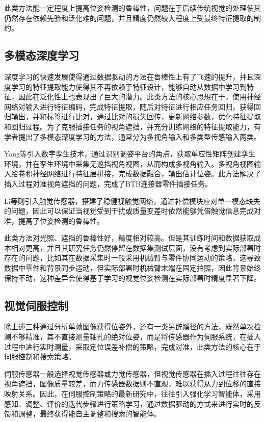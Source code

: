 \documentclass{Diploma}
\begin{document}
此类方法能一定程度上提高位姿检测的鲁棒性，问题在于后续传统视觉的处理使其仍然存在依赖先验和泛化难的问题，并且精度仍然较大程度上受最终特征提取的制约。
\subsection{多模态深度学习}
深度学习的快速发展使得通过数据驱动的方法在鲁棒性上有了飞速的提升，并且深度学习的特征提取能力使得其不再依赖于特征设计，能够自动从数据中学习到特征，因此在泛化性上也表现出了巨大的潜力。此类方法的核心思想在于，使用神经网络对输入进行特征编码，完成特征提取，随后对特征进行相应任务回归，获得回归输出，并和标签进行比对，通过比对的损失回传，更新网络参数，优化特征提取和回归过程\cite{yu2019siamese}。为了克服插接任务的视角遮挡，并充分训练网络的特征提取能力，有学者提出了多模态深度学习的方法，通常分为多视角输入和多类型传感输入两类。

Yang等引入数字孪生技术，通过识别调姿平台的角点，获取单应性矩阵创建孪生环境，并在孪生环境中采集无遮挡视角视图，从而构成多视角输入。多视角视图输入给卷积神经网络进行特征层拼接，完成数据融合，输出估计位姿。此方法解决了插入过程对准视角遮挡的问题，完成了BTB连接器零件插接任务\cite{yang2023digital}。
%

Li等则引入触觉传感器，搭建了稳健视触觉网络，通过补偿模块应对单一模态缺失的问题，因此可以保证当视觉受到干扰或质量变差时依然能够凭借触觉信息完成对准，提高了位姿检测的鲁棒性\cite{li2024v}。

此类方法对光照、遮挡的鲁棒性好，精度相对较高。但是其训练时间和数据获取成本相对更高，并且其研究任务仍然停留在数据集测试层面，没有考虑到实际部署时存在的问题，比如其在数据采集时一般采用机械臂与零件协同运动的策略，这导致数据中零件和背景同步运动，但实际部署时机械臂末端在固定拍照，因此背景始终保持不动，这种差异会使得基于学习的视觉位姿检测在实际部署时精度显著下降。
\subsection{视觉伺服控制}
除上述三种通过分析单帧图像获得位姿外，还有一类另辟蹊径的方法，既然单次检测不够精准，其不直接测量轴孔的绝对位姿，而是将传感器作为伺服系统，在插入过程中进行实时测量，采取定位误差补偿的策略，完成对准，此类方法的核心在于伺服控制和搜索策略。

伺服传感器一般选择视觉传感器或力觉传感器，但视觉传感器在插入过程往往存在视角遮挡，图像质量较差，而力传感器数据则不直观，难以获得从力到位移的直接映射关系。因此，在伺服控制策略的最新研究中，往往引入强化学习智能体，采用感知、调整、评价的迭代步骤进行策略学习，通过数据驱动的方式来进行实时的反馈和调整，最终获得能自主调整和搜索的智能体。
\end{document}
